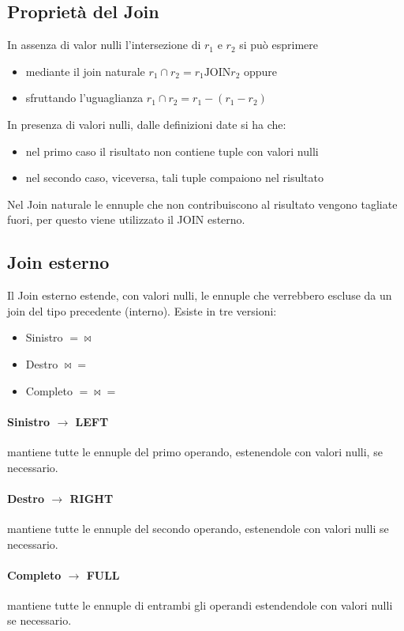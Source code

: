 \subsection*{Proprietà del Join}
In assenza di valor nulli l'intersezione di $r_1$ e $r_2$ si può esprimere
\begin{itemize}
    \item mediante il join naturale $r_1 \cap r_2 = r_1 \text{JOIN} r_2$ oppure
    \item sfruttando l'uguaglianza $r_1 \cap r_2 = r_1 - (r_1 - r_2)$
\end{itemize}
In presenza di valori nulli, dalle definizioni date si ha che:
\begin{itemize}
    \item nel primo caso il risultato non contiene tuple con valori nulli 
    \item nel secondo caso, viceversa, tali tuple compaiono nel risultato
\end{itemize}
Nel Join naturale le ennuple che non contribuiscono al risultato vengono tagliate fuori, per
questo viene utilizzato il JOIN esterno.
\subsection*{Join esterno}
Il Join esterno estende, con valori nulli, le ennuple che verrebbero escluse da un join del tipo
precedente (interno). Esiste in tre versioni:
\begin{itemize}
    \item Sinistro $=\bowtie$
    \item Destro $\bowtie=$
    \item Completo $=\bowtie=$
\end{itemize}
\paragraph*{Sinistro $\rightarrow$ LEFT} mantiene tutte le ennuple del primo operando, estenendole
con valori nulli, se necessario.
\paragraph*{Destro $\rightarrow$ RIGHT} mantiene tutte le ennuple del secondo operando, estenendole
con valori nulli se necessario.
\paragraph*{Completo $\rightarrow$ FULL} mantiene tutte le ennuple di entrambi gli operandi
estendendole con valori nulli se necessario.
